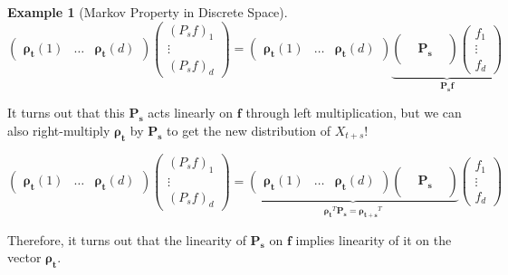 \documentclass{article}
\theoremstyle{definition}
\newtheorem{example}{Example}[section]
\theoremstyle{remark}
\theoremstyle{definition}
\begin{document}
\begin{example}[Markov Property in Discrete Space]
      \[\begin{pmatrix} \boldsymbol{\rho_t} (1) & \ldots & \boldsymbol{\rho_t} (d) \end{pmatrix} \begin{pmatrix} (P_s f)_1 \\ \vdots \\(P_s f)_d \end{pmatrix} = \begin{pmatrix} \boldsymbol{\rho_t} (1) & \ldots & \boldsymbol{\rho_t} (d) \end{pmatrix} \underbrace{\begin{pmatrix} && \\ & \mathbf{P_s} & \\ && \end{pmatrix} \begin{pmatrix} f_1 \\ \vdots \\ f_d \end{pmatrix}}_{\mathbf{P_s f}}\]

    It turns out that this $\mathbf{P_s}$ acts linearly on $\mathbf{f}$ through left multiplication, but we can also right-multiply $\boldsymbol{\rho_t}$ by $\mathbf{P_s}$ to get the new distribution of $X_{t + s}$! 

      \[\begin{pmatrix} \boldsymbol{\rho_t} (1) & \ldots & \boldsymbol{\rho_t} (d) \end{pmatrix} \begin{pmatrix} (P_s f)_1 \\ \vdots \\(P_s f)_d \end{pmatrix} = \underbrace{\begin{pmatrix} \boldsymbol{\rho_t} (1) & \ldots & \boldsymbol{\rho_t} (d) \end{pmatrix} \begin{pmatrix} && \\ & \mathbf{P_s} & \\ && \end{pmatrix}}_{\boldsymbol{\rho_t}^T \mathbf{P_s} = \boldsymbol{\rho_{t+s}}^T} \begin{pmatrix} f_1 \\ \vdots \\ f_d \end{pmatrix}\]

    Therefore, it turns out that the linearity of $\mathbf{P_s}$ on $\mathbf{f}$ implies linearity of it on the vector $\boldsymbol{\rho_t}$. 
  \end{example}
\end{document}
